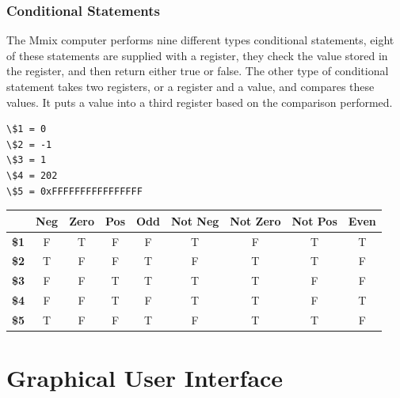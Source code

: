 \documentclass[a4paper,11pt]{report}
\begin{document}
\subsection{Conditional Statements}
The Mmix computer performs nine different types conditional statements, eight of these statements are supplied with a register, they check the value stored in the register, and then return either true or false. The other type of conditional statement takes two registers, or a register and a value, and compares these values. It puts a value into a third register based on the comparison performed.

\begin{lstlisting}
\$1 = 0
\$2 = -1
\$3 = 1
\$4 = 202
\$5 = 0xFFFFFFFFFFFFFFFF
\end{lstlisting}
\begin{center}
\begin{tabular}{| l | c | c  | c | c  | c | c  | c | c  |}
\hline
 & \textbf{Neg} & \textbf{Zero} & \textbf{Pos} & \textbf{Odd} & \textbf{Not Neg} & \textbf{Not Zero} & \textbf{Not Pos} & \textbf{Even}\\ \hline
\textbf{\$1} & F & T & F & F & T & F & T & T\\ \hline
\textbf{\$2} & T & F & F & T & F & T & T & F\\ \hline
\textbf{\$3} & F & F & T & T & T & T & F & F\\ \hline
\textbf{\$4} & F & F & T & F & T & T & F & T\\ \hline
\textbf{\$5} & T & F & F & T & F & T & T & F\\ \hline
\end{tabular}
\end{center}

\chapter{Graphical User Interface}
\end{document}
